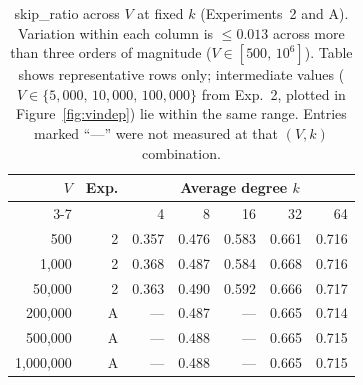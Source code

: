 \documentclass[conference]{IEEEtran}
\begin{document}
\begin{table}[t]
\centering
\caption{skip\_ratio across $V$ at fixed $k$ (Experiments~2 and A).
Variation within each column is $\leq 0.013$ across more than three
orders of magnitude ($V\in[500,\,10^6]$).
Table shows representative rows only; intermediate values
($V\in\{5{,}000,\,10{,}000,\,100{,}000\}$ from Exp.~2,
plotted in Figure~\ref{fig:vindep}) lie within the same range.
Entries marked ``---'' were not measured at that $(V,k)$ combination.}
\label{tab:vindependence}
\small
\setlength{\tabcolsep}{4pt}
\begin{tabular}{rrrrrrr}
\toprule
\multirow{2}{*}{$V$} & \multirow{2}{*}{Exp.} & \multicolumn{5}{c}{Average degree $k$} \\
\cmidrule(lr){3-7}
 & & 4 & 8 & 16 & 32 & 64 \\
\midrule
500        & 2 & 0.357 & 0.476 & 0.583 & 0.661 & 0.716 \\
1,000      & 2 & 0.368 & 0.487 & 0.584 & 0.668 & 0.716 \\
50,000     & 2 & 0.363 & 0.490 & 0.592 & 0.666 & 0.717 \\
\midrule
200,000    & A & --- & 0.487 & --- & 0.665 & 0.714 \\
500,000    & A & --- & 0.488 & --- & 0.665 & 0.715 \\
1,000,000  & A & --- & 0.488 & --- & 0.665 & 0.715 \\
\bottomrule
\end{tabular}
\end{table}
\end{document}
